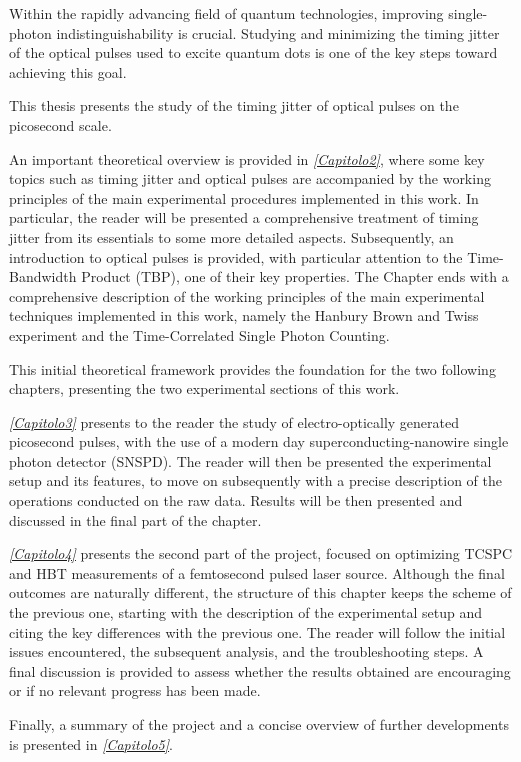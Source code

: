 Within the rapidly advancing field of quantum technologies, improving single-photon indistinguishability is crucial. Studying and minimizing the timing jitter of the optical pulses used to excite quantum dots is one of the key steps toward achieving this goal.


This thesis presents the study of the timing jitter of optical pulses on the picosecond scale.


An important theoretical overview is provided in \emph{\autoref{Capitolo2}}, where some key topics such as timing jitter and optical pulses are accompanied by the working principles of the main experimental procedures implemented in this work.
In particular, the reader will be presented a comprehensive treatment of timing jitter from its essentials to some more detailed aspects.
Subsequently, an introduction to optical pulses is provided, with particular attention to the Time-Bandwidth Product (TBP), one of their key properties.
The Chapter ends with a comprehensive description of the working principles of the main experimental techniques implemented in this work, namely the Hanbury Brown and Twiss experiment and the Time-Correlated Single Photon Counting.

This initial theoretical framework provides the foundation for the two following chapters, presenting the two experimental sections of this work.


\emph{\autoref{Capitolo3}} presents to the reader the study of electro-optically generated picosecond pulses, with the use of a modern day superconducting-nanowire single photon detector (SNSPD).
The reader will then be presented the experimental setup and its features, to move on subsequently with a precise description of the operations conducted on the raw data. Results will be then presented and discussed in the final part of the chapter.


\emph{\autoref{Capitolo4}} presents the second part of the project, focused on optimizing TCSPC and HBT measurements of a femtosecond pulsed laser source.
Although the final outcomes are naturally different, the structure of this chapter keeps the scheme of the previous one, starting with the description of the experimental setup and citing the key differences with the previous one.
The reader will follow the initial issues encountered, the subsequent analysis, and the troubleshooting steps.
A final discussion is provided to assess whether the results obtained are encouraging or if no relevant progress has been made.


Finally, a summary of the project and a concise overview of further developments is presented in \emph{\autoref{Capitolo5}}.








